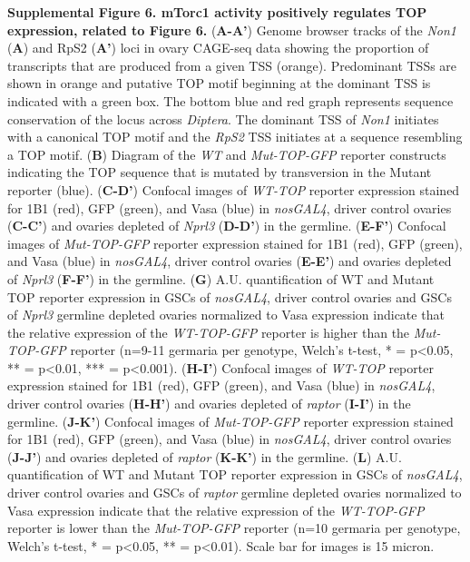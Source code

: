 \documentclass[12pt,twoside]{reedthesis}
\begin{document}
\textbf{Supplemental Figure 6. mTorc1 activity positively regulates TOP
expression, related to Figure 6.} (\textbf{A-A'}) Genome browser tracks of
the \emph{Non1} (\textbf{A}) and RpS2 (\textbf{A'}) loci in ovary CAGE-seq data showing
the proportion of transcripts that are produced from a given TSS
(orange). Predominant TSSs are shown in orange and putative TOP motif
beginning at the dominant TSS is indicated with a green box. The bottom
blue and red graph represents sequence conservation of the locus across
\emph{Diptera}. The dominant TSS of \emph{Non1} initiates with a canonical TOP
motif and the \emph{RpS2} TSS initiates at a sequence resembling a TOP motif.
(\textbf{B}) Diagram of the \emph{WT} and \emph{Mut-TOP-GFP} reporter constructs
indicating the TOP sequence that is mutated by transversion in the
Mutant reporter (blue). (\textbf{C-D'}) Confocal images of \emph{WT-TOP} reporter
expression stained for 1B1 (red), GFP (green), and Vasa (blue) in
\emph{nosGAL4}, driver control ovaries (\textbf{C-C'}) and ovaries depleted of
\emph{Nprl3} (\textbf{D-D'}) in the germline. (\textbf{E-F'}) Confocal images of
\emph{Mut-TOP-GFP} reporter expression stained for 1B1 (red), GFP (green),
and Vasa (blue) in \emph{nosGAL4}, driver control ovaries (\textbf{E-E'}) and
ovaries depleted of \emph{Nprl3} (\textbf{F-F'}) in the germline. (\textbf{G}) A.U.
quantification of WT and Mutant TOP reporter expression in GSCs of
\emph{nosGAL4}, driver control ovaries and GSCs of \emph{Nprl3} germline depleted
ovaries normalized to Vasa expression indicate that the relative
expression of the \emph{WT-TOP-GFP} reporter is higher than the \emph{Mut-TOP-GFP}
reporter (n=9-11 germaria per genotype, Welch's t-test, * = p\textless0.05,
** = p\textless0.01, *** = p\textless0.001). (\textbf{H-I'}) Confocal images of
\emph{WT-TOP} reporter expression stained for 1B1 (red), GFP (green), and
Vasa (blue) in \emph{nosGAL4}, driver control ovaries (\textbf{H-H'}) and ovaries
depleted of \emph{raptor} (\textbf{I-I'}) in the germline. (\textbf{J-K'}) Confocal
images of \emph{Mut-TOP-GFP} reporter expression stained for 1B1 (red), GFP
(green), and Vasa (blue) in \emph{nosGAL4}, driver control ovaries (\textbf{J-J'})
and ovaries depleted of \emph{raptor} (\textbf{K-K'}) in the germline. (\textbf{L})
A.U. quantification of WT and Mutant TOP reporter expression in GSCs of
\emph{nosGAL4}, driver control ovaries and GSCs of \emph{raptor} germline depleted
ovaries normalized to Vasa expression indicate that the relative
expression of the \emph{WT-TOP-GFP} reporter is lower than the \emph{Mut-TOP-GFP}
reporter (n=10 germaria per genotype, Welch's t-test, * = p\textless0.05, **
= p\textless0.01). Scale bar for images is 15 micron.
\end{document}
